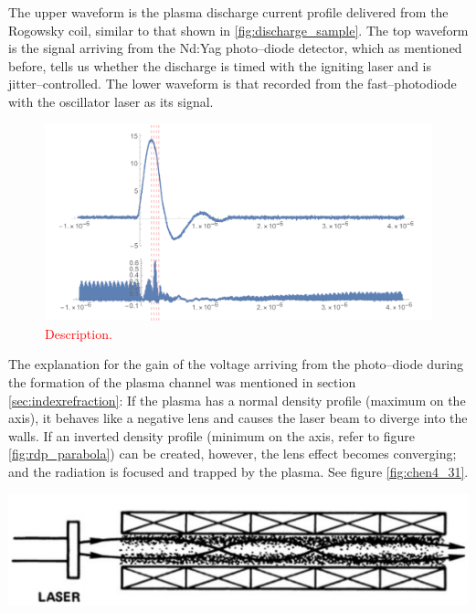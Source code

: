 \documentclass[justified,nofonts,nobib,openany]{tufte-book}
\begin{document}
The upper waveform is the plasma discharge current profile delivered from the Rogowsky coil, similar to that shown in \ref{fig:discharge_sample}. The top waveform is the signal arriving from the Nd:Yag photo--diode detector, which as mentioned before, tells us whether the discharge is timed with the igniting laser and is jitter--controlled. The lower waveform is that recorded from the fast--photodiode with the oscillator laser as its signal.
\begin{figure}
    \centering
    \includegraphics[width=\textwidth]{figures/oscillator/guiding.pdf}
    \caption{\textcolor{red}{Description.}}
    \label{fig:oscillator_gain}
\end{figure}

The explanation for the gain of the voltage arriving from the photo--diode during the formation of the plasma channel was mentioned in section \ref{sec:indexrefraction}: If the plasma has a normal density profile (maximum on the axis), it behaves like a negative lens and causes the laser beam to diverge into the walls. If an inverted density profile (minimum on the axis, refer to figure \ref{fig:rdp_parabola}) can be created, however, the lens effect becomes converging; and the radiation is focused and trapped by the plasma. See figure \ref{fig:chen4_31}.
\begin{marginfigure}
\includegraphics[width=\marginparwidth]{./figures/chen4_31.PNG}
\caption{A plasma confined inside the capillary will trap the \SI{800}{\nm} laser light only if the plasma has a density minimum on axis.}
\label{fig:chen4_31}
\end{marginfigure}
\end{document}
